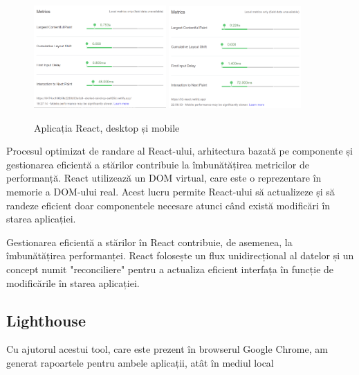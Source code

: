 \documentclass[12pt, a4paper]{report}
\begin{document}
\begin{figure}[htbp]
	\centering
	\includegraphics[width=0.45\textwidth]{02_desktop_deployed.png}
	\includegraphics[width=0.45\textwidth]{02_mobile_deployed.png}
	\caption{Aplicația React, desktop și mobile}
	\label{fig:02-deployed}
\end{figure}

Procesul optimizat de randare al React-ului, arhitectura bazată pe componente și gestionarea eficientă a stărilor contribuie la îmbunătățirea metricilor de performanță. React utilizează un DOM virtual, care este o reprezentare în memorie a DOM-ului real. Acest lucru permite React-ului să actualizeze și să randeze eficient doar componentele necesare atunci când există modificări în starea aplicației.

Gestionarea eficientă a stărilor în React contribuie, de asemenea, la îmbunătățirea performanței. React folosește un flux unidirecțional al datelor și un concept numit "reconciliere" pentru a actualiza eficient interfața în funcție de modificările în starea aplicației.
\subsection{Lighthouse}

Cu ajutorul acestui tool, care este prezent în browserul Google Chrome, am generat rapoartele pentru ambele aplicații, atât în mediul local
\end{document}
